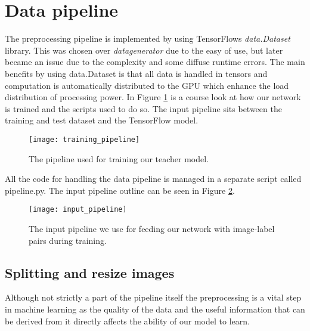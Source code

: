 \documentclass[thesis.tex]{subfiles}
\begin{document}
\section{Data pipeline} \label{sec:data_pipeline}
The preprocessing pipeline is implemented by using TensorFlows \textit{data.Dataset} library. This was chosen over \textit{datagenerator} due to the easy of use, but later became an issue due to the complexity and some diffuse runtime errors. The main benefits by using data.Dataset is that all data is handled in tensors and computation is automatically distributed to the GPU which enhance the load distribution of processing power. In Figure \ref{fig:training_pipeline} is a course look at how our network is trained and the scripts used to do so. The input pipeline sits between the training and test dataset and the TensorFlow model.

\begin{figure} %
  \begin{center}
    \texttt{[image: training\_pipeline]}
    \caption[Pipeline for training model.]{The pipeline used for training our teacher model.}
    \label{fig:training_pipeline}
  \end{center}
\end{figure}


All the code for handling the data pipeline is managed in a separate script called pipeline.py. The input pipeline outline can be seen in Figure \ref{fig:input_pipeline}.

\begin{figure} %
  \begin{center}
    \texttt{[image: input\_pipeline]}
    \caption[The input pipeline]{The input pipeline we use for feeding our network with image-label pairs during training.}
    \label{fig:input_pipeline}
  \end{center}
\end{figure}




\subsection{Splitting and resize images}
Although not strictly a part of the pipeline itself the preprocessing is a vital step in machine learning as the quality of the data and the useful information that can be derived from it directly affects the ability of our model to learn.
\end{document}
